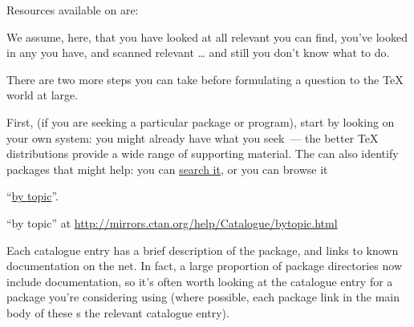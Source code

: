 Resources available on  are:
\begin{ctanrefs}
\item[\nothtml{\rmfamily}Dante \acro{FAQ}]
\item[\nothtml{\rmfamily}French \acro{FAQ}]
\item[\nothtml{\rmfamily}Sources of this \acro{FAQ}]
\item[\nothtml{\rmfamily}Obsolete \texttt{comp.text.tex} \acro{FAQ}]%
\item[\nothtml{\rmfamily}The visual \acro{FAQ}]
\end{ctanrefs}


We assume, here, that you have looked at all relevant
 you can find, you've looked in
any  you have, and scanned relevant
\dots{} and still you don't know what
to do.

There are two more steps you can take before formulating a question to
the \TeX{} world at large.

First, (if you are seeking a particular package or program), start by
looking on your own system: you might already have what you seek~---
the better \TeX{} distributions provide a wide range of supporting
material.  The  can also
identify packages that might help: you can %
\href{http://www.tex.ac.uk/search}{search it}, or you can browse it
\begin{hyperversion}
``\href{http://mirrors.ctan.org/help/Catalogue/bytopic.html}{by topic}''.
\end{hyperversion}
\begin{flatversion}
``by topic'' at
\url{http://mirrors.ctan.org/help/Catalogue/bytopic.html} 
\end{flatversion}
Each catalogue entry has a brief description of the package, and links to
known documentation on the net.  In fact, a large proportion of
 package directories now include documentation, so it's
often worth looking at the catalogue entry for a package you're considering
using (where possible, each package link in the main body of these
s 
the relevant catalogue entry).

